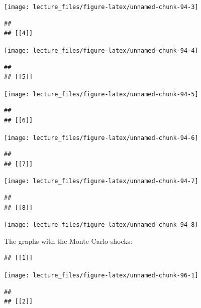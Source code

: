 \documentclass[
]{book}
\begin{document}
\begin{center}\texttt{[image: lecture\_files/figure-latex/unnamed-chunk-94-3]} \end{center}

\begin{verbatim}
## 
## [[4]]
\end{verbatim}

\begin{center}\texttt{[image: lecture\_files/figure-latex/unnamed-chunk-94-4]} \end{center}

\begin{verbatim}
## 
## [[5]]
\end{verbatim}

\begin{center}\texttt{[image: lecture\_files/figure-latex/unnamed-chunk-94-5]} \end{center}

\begin{verbatim}
## 
## [[6]]
\end{verbatim}

\begin{center}\texttt{[image: lecture\_files/figure-latex/unnamed-chunk-94-6]} \end{center}

\begin{verbatim}
## 
## [[7]]
\end{verbatim}

\begin{center}\texttt{[image: lecture\_files/figure-latex/unnamed-chunk-94-7]} \end{center}

\begin{verbatim}
## 
## [[8]]
\end{verbatim}

\begin{center}\texttt{[image: lecture\_files/figure-latex/unnamed-chunk-94-8]} \end{center}

The graphs with the Monte Carlo shocks:

\begin{verbatim}
## [[1]]
\end{verbatim}

\begin{center}\texttt{[image: lecture\_files/figure-latex/unnamed-chunk-96-1]} \end{center}

\begin{verbatim}
## 
## [[2]]
\end{verbatim}
\end{document}
